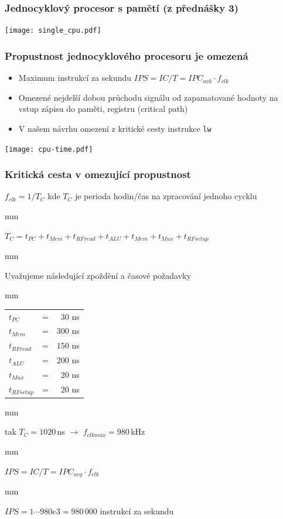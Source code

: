\documentclass{beamer}
\begin{document}
\begin{frame}
\frametitle{Jednocyklový procesor s pamětí (z přednášky 3)}
\texttt{[image: single\_cpu.pdf]}
\end{frame}

\begin{frame}
\frametitle{Propustnost jednocyklového procesoru je omezená}

\begin{itemize}
 \item Maximum instrukcí za sekundu $IPS = IC / T = IPC_{avk} \cdot f_{clk}$
 \item Omezené nejdelší dobou průchodu signálu od zapamatované hodnoty na vstup zápisu do paměti, registru  (critical path)
 \item V našem návrhu omezení z kritické cesty instrukce \texttt{lw}
\end{itemize}

\texttt{[image: cpu-time.pdf]}
\end{frame}

\begin{frame}
\frametitle{Kritická cesta v omezující propustnost}

$f_{clk} = 1 / T_{C}$ kde $T_{C}$ je perioda hodin/čas na zpracování jednoho cycklu

 mm

$T_{C} = t_{PC} + t_{Mem} + t_{RFread} + t_{ALU} + t_{Mem} + t_{Mux} + t_{RFsetup}$

 mm

Uvažujeme následující zpoždění a časové požadavky

 mm

\begin{tabular}{l c r}
$t_{PC}$ & = & $30$ ns \\
$t_{Mem}$ & = & $300$ ns \\
$t_{RFread}$ & = & $150$ ns \\
$t_{ALU}$ & = & $200$ ns \\
$t_{Mux}$ & = & $20$ ns \\
$t_{RFsetup}$ & = & $20$ ns \\
\end{tabular}

 mm

tak $T_{C} = 1020$\,ns $\rightarrow$ $f_{clk max} = 980$\,kHz

 mm

$IPS = IC / T = IPC_{avg} \cdot f_{clk}$

 mm

$IPS = 1 \cdots 980e3 = 980\,000$ instrukcí za sekundu

\end{frame}
\end{document}
